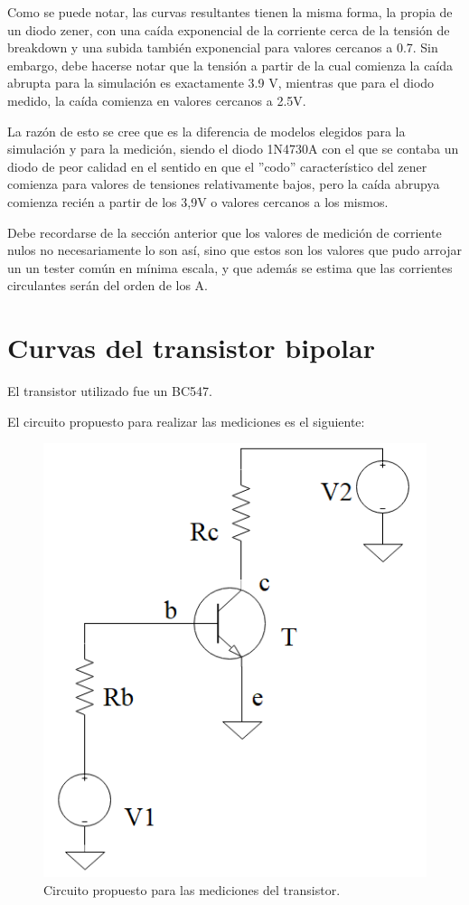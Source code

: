 \documentclass[../../e1_tp1_main.tex]{subfiles}
\begin{document}
	Como se puede notar, las curvas resultantes tienen la misma forma, la propia de un diodo zener, con una caída exponencial de la corriente cerca de la tensión de breakdown y una subida también exponencial para valores cercanos a 0.7. Sin embargo, debe hacerse notar que la tensión a partir de la cual comienza la caída abrupta para la simulación es exactamente 3.9 V, mientras que para el diodo medido, la caída comienza en valores cercanos a 2.5V.\par
	 La razón de esto se cree que es la diferencia de modelos elegidos para la simulación y para la medición, siendo el diodo 1N4730A con el que se contaba un diodo de peor calidad en el sentido en que el ''codo'' característico del zener comienza para valores de tensiones relativamente bajos, pero la caída abrupya comienza recién a partir de los 3,9V o valores cercanos a los mismos.\par 
Debe recordarse de la sección anterior que los valores de medición de corriente nulos no necesariamente lo son así, sino que estos son los valores que pudo arrojar un un tester común en mínima escala, y que además se estima que las corrientes circulantes serán del orden de los \micro A. \par

\section{Curvas del transistor bipolar}

 El transistor utilizado fue un BC547. \par

 	El circuito propuesto para realizar las mediciones es el siguiente:

	\begin{figure}[H]	%
		\centering
		\includegraphics[scale=1.2]{imagenes/circuito_transistor.png}
		\caption{Circuito propuesto para las mediciones del transistor.}
		\label{fig:ej5_circuito_transistor}
	\end{figure}
	
\end{document}
